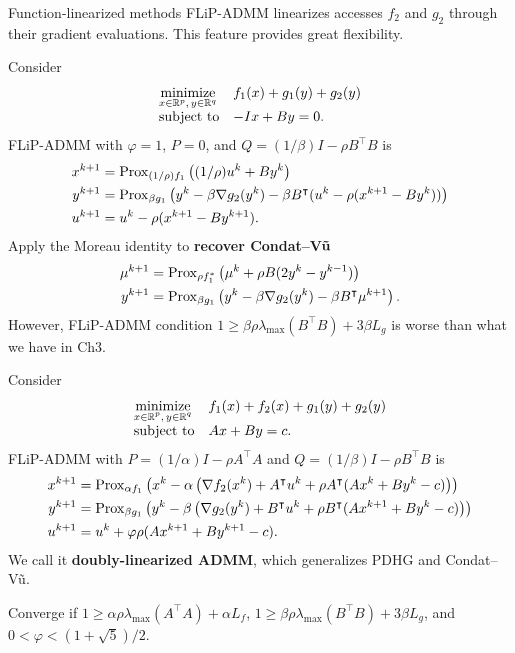 \documentclass[10pt,mathserif]{beamer}
\begin{document}
\begin{frame}{Function-linearized methods}
FLiP-ADMM linearizes accesses $f_2$ and $g_2$ through their gradient evaluations.
This feature provides great flexibility.
\medskip

Consider
\[
    \begin{array}{ll}
    \underset{x\in \mathbb{R}^p,\,y\in \mathbb{R}^q}{\mbox{minimize}}&f_1(x)+g_1(y)+g_2(y)\\
    \mbox{subject to}&-Ix+By=0.
    \end{array}
\]
FLiP-ADMM with $\varphi=1$, $P=0$, and $Q=(1/\beta)I-\rho B^\intercal  B$ is
\begin{align*}
x^{k+1}&=\mathrm{Prox}_{(1/\rho)f_1}\left((1/\rho)u^k+By^{k} \right)\\
y^{k+1}&=\mathrm{Prox}_{\beta g_1}\left(y^k-\beta \nabla g_2(y^k)-\beta B^\intercal ( u ^k-\rho (x^{k+1}-By^{k}))\right)\\
 u ^{k+1}&= u ^{k}-\rho(x^{k+1}-By^{k+1}).
\end{align*}
Apply the Moreau identity to \textbf{recover Condat--V\~u}
\begin{align*}
\mu^{k+1}&=\mathrm{Prox}_{\rho  f_1^*}\left(\mu^k+\rho B(2y^k-y^{k-1})\right)\\
y^{k+1}&=\mathrm{Prox}_{\beta g_1}\left(y^k-\beta \nabla g_2(y^k)-\beta B^\intercal \mu^{k+1}\right).
\end{align*}
However, FLiP-ADMM condition $1\ge  \beta\rho\lambda_\mathrm{max}(B^\intercal  B)+3\beta L_g$ is worse than what we have in Ch3.
\end{frame}

\begin{frame}
Consider
\[
\begin{array}{ll}
\underset{\substack{x\in \mathbb{R}^p,\,y\in \mathbb{R}^q}}{\mbox{minimize}}&f_1(x)+f_2(x)+g_1(y)+g_2(y)\\
\mbox{subject to}&Ax+By=c.
\end{array}
\]
FLiP-ADMM with $P=(1/\alpha)I-\rho A^\intercal  A$ and $Q=(1/\beta)I-\rho B^\intercal  B$ is
\begin{align*}
x^{k+1}&=
\mathrm{Prox}_{\alpha f_1}\left(x^k-\alpha\left(\nabla f_2(x^k)+ A^\intercal  u ^k+\rho A^\intercal (Ax^k+By^k-c)\right)\right)\\
y^{k+1}&=
\mathrm{Prox}_{\beta g_1}
\left(y^k-\beta \left(\nabla g_2(y^k)+ B^\intercal  u ^k+\rho B^\intercal (Ax^{k+1}+By^k-c)
\right)
\right)\\
 u ^{k+1}&= u ^{k}+\varphi\rho(Ax^{k+1}+By^{k+1}-c).
\end{align*}
We call it \textbf{doubly-linearized ADMM}, which generalizes PDHG and Condat--V\~u.
\medskip

Converge if $1\ge \alpha \rho\lambda_\mathrm{max}(A^\intercal  A)+\alpha L_f$, $1\ge \beta \rho\lambda_\mathrm{max}(B^\intercal  B)+3\beta L_g$, and $0<\varphi<(1+\sqrt{5})/2$.
\end{frame}
\end{document}
